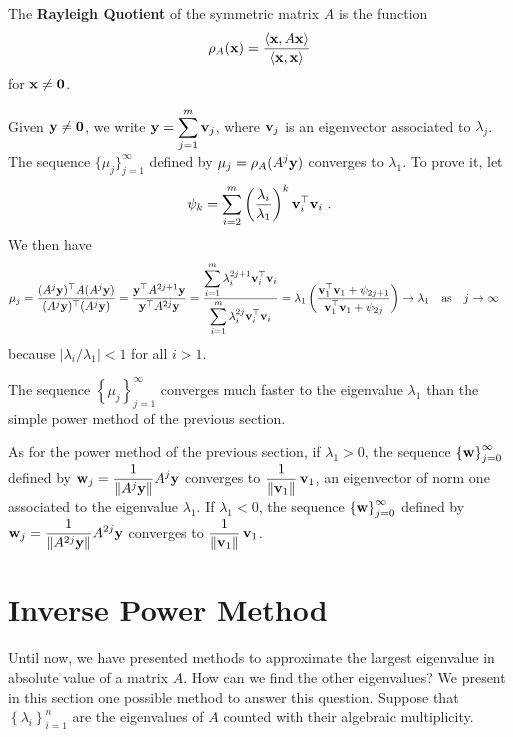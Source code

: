 \begin{defn}
The {\bfseries Rayleigh Quotient} of the
symmetric matrix $A$ is the function
\[
\rho_A(\mathbf{x}) = \frac{\left\langle{\mathbf{x}} , {A\mathbf{x}}\right\rangle}{\left\langle{\mathbf{x}} , {\mathbf{x}}\right\rangle}
\]
for $\mathbf{x} \neq \mathbf{0}$.
\end{defn}

Given $\mathbf{y} \neq \mathbf{0}$, we write
$\displaystyle \mathbf{y} = \sum_{j=1}^m \mathbf{v}_j$, where $\mathbf{v}_j$ is
an eigenvector associated to $\lambda_j$.  The sequence
$\displaystyle \{\mu_j\}_{j=1}^\infty$ defined by
$\displaystyle \mu_j = \rho_A(A^j\mathbf{y})$
converges to $\lambda_1$.  To prove it, let
\[
\psi_k = \sum_{i=2}^m
\left(\frac{\lambda_i}{\lambda_1}\right)^k \VEC{v}_i^\top \VEC{v}_i \ .
\]
We then have
\begin{align*}
\mu_j &= \frac{(A^j\mathbf{y})^\top A (A^j \mathbf{y})}
{(A^j\mathbf{y})^\top (A^j \mathbf{y})}
= \frac{\mathbf{y}^\top A^{2j+1} \mathbf{y}}
{\mathbf{y}^\top A^{2j} \mathbf{y}}
= \frac{\displaystyle \sum_{i=1}^m \lambda_i^{2j+1} \mathbf{v}_i^\top\mathbf{v}_i}
{\displaystyle \sum_{i=1}^m \lambda_i^{2j} \mathbf{v}_i^\top \mathbf{v}_i}
= \lambda_1 \left(
\frac{\displaystyle \mathbf{v}_1^\top \mathbf{v}_1 + \psi_{2j+1}}
{\displaystyle \mathbf{v}_1^\top \mathbf{v}_1 + \psi_{2j}} \right)
\rightarrow \lambda_1
\quad \text{as} \quad j\rightarrow \infty
\end{align*}
because $|\lambda_i/\lambda_1|<1$ for all $i>1$.

The sequence $\displaystyle \left\{ \mu_j \right\}_{j=1}^\infty$
converges much faster to the eigenvalue $\lambda_1$ than the simple power
method of the previous section.

As for the power method of the previous section, if $\lambda_1 > 0$,
the sequence $\displaystyle \left\{\mathbf{w}\right\}_{j=0}^\infty$
defined by $\displaystyle \mathbf{w}_j = \frac{1}{\|A^j\mathbf{y}\|}A^j\mathbf{y}$
converges to $\displaystyle \frac{1}{\|\mathbf{v}_1\|}\, \mathbf{v}_1$, an
eigenvector of norm one associated to the eigenvalue $\lambda_1$.
If $\lambda_1 < 0$, the sequence
$\displaystyle \left\{\mathbf{w}\right\}_{j=0}^\infty$
defined by $\displaystyle \mathbf{w}_j = \frac{1}{\|A^{2j}\mathbf{y}\|}A^{2j}\mathbf{y}$
converges to $\displaystyle \frac{1}{\|\mathbf{v}_1\|}\, \mathbf{v}_1$.

\section{Inverse Power Method}

Until now, we have presented methods to approximate the largest
eigenvalue in absolute value of a  matrix $A$.  How can we
find the other eigenvalues?  We present in this section one possible
method to answer this question.  Suppose that
$\displaystyle \left\{ \lambda_i \right\}_{i=1}^n$
are the eigenvalues of $A$ counted with their algebraic multiplicity.

